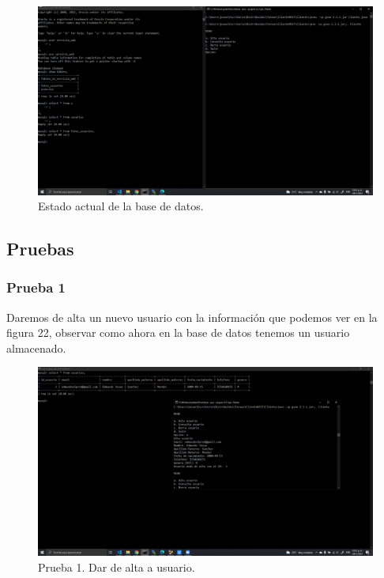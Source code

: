 \documentclass[11pt]{article}
\begin{document}
		\begin{figure}[H]
			\centering
			\includegraphics[scale=0.34]{resources/compilacioncliente.png}
			\caption{Estado actual de la base de datos.}\label{fig:picture}
		\end{figure}
		\subsection{Pruebas}
		\subsubsection{Prueba 1}		
 Daremos de alta un nuevo usuario con la información que podemos ver en la figura 22, observar como ahora en la base de datos tenemos un usuario almacenado.
	\begin{figure}[H]
			\centering
			\includegraphics[scale=0.34]{resources/prueba1.png}
			\caption{Prueba 1. Dar de alta a usuario.}\label{fig:picture}
		\end{figure}
\end{document}
